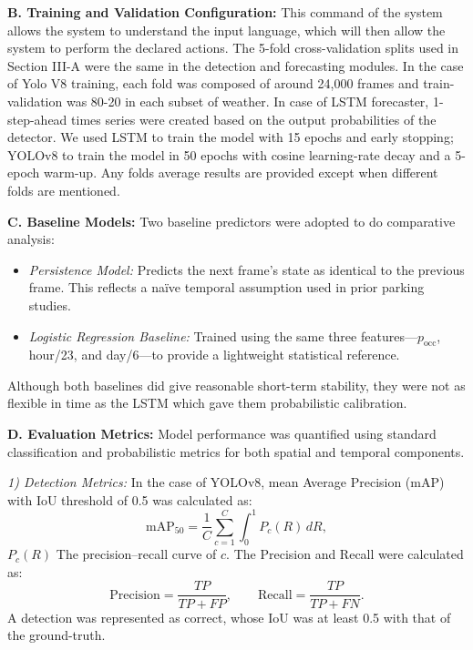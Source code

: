 \documentclass[conference]{IEEEtran}
\begin{document}
\vspace{0.4em}
\noindent\textbf{B. Training and Validation Configuration:}
This command of the system allows the system to understand the input language, which will then allow the system to perform the declared actions. The 5-fold cross-validation splits used in Section III-A were the same in the detection and forecasting modules.  
In the case of Yolo V8 training, each fold was composed of around 24,000 frames and train-validation was 80-20 in each subset of weather. In case of LSTM forecaster, 1-step-ahead times series were created based on the output probabilities of the detector.  
We used LSTM to train the model with 15 epochs and early stopping; YOLOv8 to train the model in 50 epochs with cosine learning-rate decay and a 5-epoch warm-up.  
Any folds average results are provided except when different folds are mentioned.

\vspace{0.4em}
\noindent\textbf{C. Baseline Models:}
Two baseline predictors were adopted to do comparative analysis:
\begin{itemize}
    \item \textit{Persistence Model:} Predicts the next frame’s state as identical to the previous frame. This reflects a naïve temporal assumption used in prior parking studies.
    \item \textit{Logistic Regression Baseline:} Trained using the same three features—$p_{\text{occ}}$, hour/23, and day/6—to provide a lightweight statistical reference.
\end{itemize}
Although both baselines did give reasonable short-term stability, they were not as flexible in time as the LSTM which gave them probabilistic calibration.

\vspace{0.4em}
\noindent\textbf{D. Evaluation Metrics:}
Model performance was quantified using standard classification and probabilistic metrics for both spatial and temporal components.

\textit{1) Detection Metrics:}  
In the case of YOLOv8, mean Average Precision (mAP) with IoU threshold of 0.5 was calculated as:
\[
\text{mAP}_{50} = \frac{1}{C} \sum_{c=1}^{C} \int_0^1 P_c(R)\,dR,
\]
$P_c(R)$ The precision–recall curve of $c$. The Precision and Recall were calculated as:
\[
\text{Precision} = \frac{TP}{TP + FP}, \qquad 
\text{Recall} = \frac{TP}{TP + FN}.
\]
A detection was represented as correct, whose IoU was at least 0.5 with that of the ground-truth.  
\end{document}
